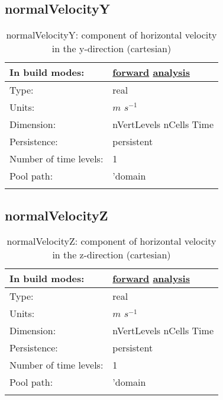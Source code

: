 \subsection[normalVelocityY]{normalVelocityY}
\label{subsec:var_sec_diagnostics_normalVelocityY}
\begin{center}
\begin{longtable}{| p{2.0in} | p{4.0in} |}
        \hline 
        In build modes: & \hyperref[subsec:forward_var_tab_diagnostics]{forward} \hyperref[subsec:analysis_var_tab_diagnostics]{analysis} \\
        \hline 
        Type: & real \\
        \hline 
        Units: & $m$ $s^{-1}$ \\
        \hline 
        Dimension: & nVertLevels nCells Time \\
        \hline 
        Persistence: & persistent \\
        \hline 
        Number of time levels: & 1 \\
        \hline 
            Pool path: & 'domain %
 \\
		 \hline 
    \caption{normalVelocityY: component of horizontal velocity in the y-direction (cartesian)}
\end{longtable}
\end{center}
\subsection[normalVelocityZ]{normalVelocityZ}
\label{subsec:var_sec_diagnostics_normalVelocityZ}
\begin{center}
\begin{longtable}{| p{2.0in} | p{4.0in} |}
        \hline 
        In build modes: & \hyperref[subsec:forward_var_tab_diagnostics]{forward} \hyperref[subsec:analysis_var_tab_diagnostics]{analysis} \\
        \hline 
        Type: & real \\
        \hline 
        Units: & $m$ $s^{-1}$ \\
        \hline 
        Dimension: & nVertLevels nCells Time \\
        \hline 
        Persistence: & persistent \\
        \hline 
        Number of time levels: & 1 \\
        \hline 
            Pool path: & 'domain %
 \\
		 \hline 
    \caption{normalVelocityZ: component of horizontal velocity in the z-direction (cartesian)}
\end{longtable}
\end{center}

